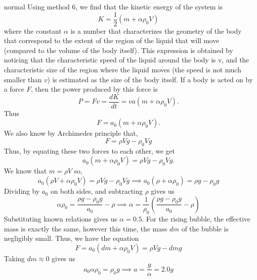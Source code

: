 \begin{solution}{normal}
Using method 6, we find that the kinetic energy of the system is 
\[
K = \frac{1}{2}(m + \alpha\rho_0 V)
\]  where the constant $\alpha$ is a number that characterizes the geometry of the body that correspond to the extent of the region of the liquid that will move (compared to the volume of the body itself). This expression is obtained by noticing that the characteristic speed of the liquid around the body is v, and the characteristic size of the region where the liquid moves (the speed is not much smaller than $v$) is estimated as the size of the body itself.  If a body is acted on by a force $F$, then the power produced by this force is 
\[P = F v = \frac{dK}{dt} = va(m + \alpha\rho_0 V ).
\] Thus
\[
F = a_0 (m + \alpha\rho_0 V).
\]
We also know by Archimedes principle that,
\[F = \rho Vg - \rho_0 Vg
\]Thus, by equating these two forces to each other, we get 
\[a_0(m + \alpha\rho_0 V) = \rho Vg - \rho_0 Vg.
\] We know that $m = \rho V$ so,
\[a_0(\rho V + \alpha\rho_0 V) = \rho Vg - \rho_0 Vg\implies a_0(\rho + \alpha\rho_0 ) = \rho g - \rho_0 g
\]Dividing by $a_0$ on both sides, and subtracting $\rho$ gives us 
\[\alpha\rho_0 = \frac{\rho g - \rho_0 g}{a_0} - \rho\implies \alpha = \frac{1}{\rho_0}\left(\frac{\rho g - \rho_0 g}{a_0} - \rho\right)
\] Substituting known relations gives us $\alpha = 0.5$. For the rising bubble, the effective mass is exactly the same, however this time, the mass $dm$ of the bubble is negligibly small. Thus, we have the equation 
\[F = a_0(dm + \alpha\rho_0 V) = \rho V g - dm g
\]
Taking $dm\approx 0$ gives us 
\[a_0\alpha\rho_0 = \rho_0 g\implies a = \frac{g}{\alpha} = \boxed{2.0 g}\]
\end{solution}
